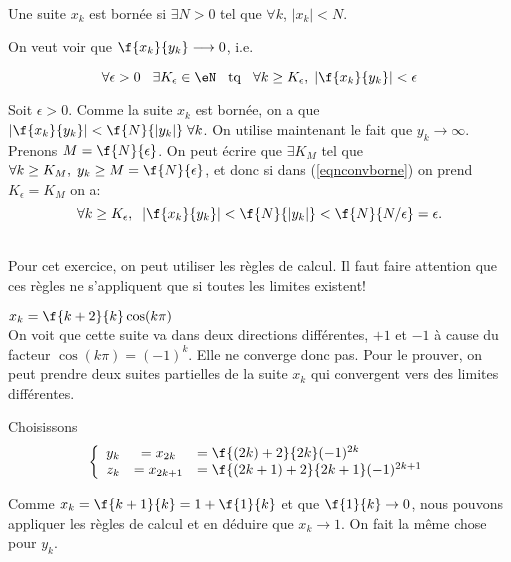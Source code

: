 \\

\noindent Une suite $x_k$ est bornée si $\exists N>0$ tel que $\forall k$, $|x_k| < N$.

\noindent On veut voir que $\f{x_k}{y_k}\longrightarrow 0$, i.e.

\begin{equation} 
\label{eqnconvborne}  \forall  \epsilon > 0 \hspace{0.3cm} \exists K_\epsilon \in \eN \hspace{0.3cm} {\rm tq} \hspace{0.3cm} \forall k \geq K_\epsilon, \; |\f{x_k}{y_k}| < \epsilon \end{equation}

\noindent Soit $\epsilon >0$. Comme la suite $x_k$ est bornée, on a que  $|\f{x_k}{y_k}|<\f{N}{|y_k|}\; \forall k$. On utilise maintenant le fait que $y_k \longrightarrow \infty$. Prenons $M=\f{N}{\epsilon}$. On peut écrire que $\exists K_M$ tel que $\forall k \geq K_M, \; y_k \geq M=\f{N}{\epsilon}$, et donc si dans (\ref{eqnconvborne}) on prend $K_\epsilon= K_M$ on a:\[\forall k \geq K_\epsilon,\; \; |\f{x_k}{y_k}|<\f{N}{|y_k|}<\f{N}{N/\epsilon}=\epsilon.\]



\\

\noindent Pour cet exercice, on peut utiliser les règles de calcul. Il faut faire attention que ces règles ne s'appliquent que si toutes les limites existent!

\vspace{0.5cm}
 $x_k = \f{k+2}{k}\cos(k\pi)$\\

\noindent On voit que cette suite va dans deux directions différentes, $+1$ et $-1$ à cause du facteur $\cos(k\pi)=(-1)^k$. Elle ne converge donc pas. Pour le prouver, on peut prendre deux suites partielles de la suite $x_k$ qui convergent vers des limites différentes. 

\noindent Choisissons \[\left\{ \begin{array}{rcl} y_k &= x_{2k}&= \f{(2k)+2}{2k}(-1)^{2k}\\
 							  z_k &= x_{2k+1} &= \f{(2k+1)+2}{2k+1} (-1)^{2k+1}\end{array}\right.\]

\noindent Comme $x_k =\f{k+1}{k}= 1+\f{1}{k}$	et que $\f{1}{k} \rightarrow  0$, nous pouvons appliquer les règles de calcul et en déduire que $x_k \rightarrow  1$. On fait la même chose pour $y_k$.				  


